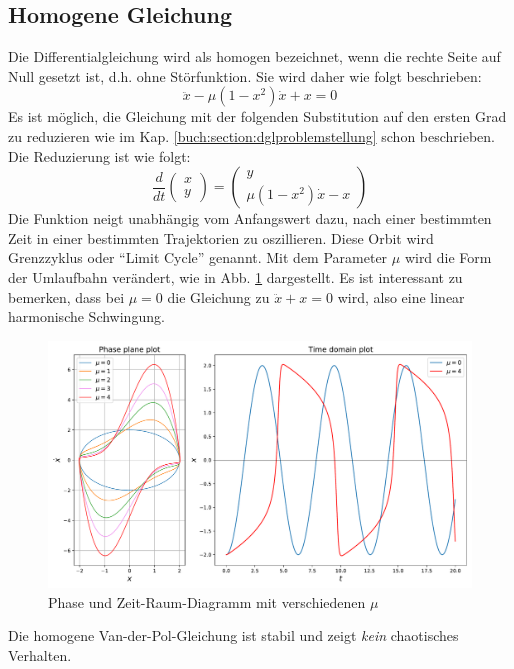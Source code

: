\subsection{Homogene Gleichung
\label{vanderpol:subsection:homogene}}
Die Differentialgleichung wird als homogen bezeichnet, wenn die rechte Seite auf Null gesetzt ist, d.h. ohne Störfunktion. Sie wird daher wie folgt beschrieben:
\begin{equation}
	\ddot{x} - \mu \left(1-x^{2}\right)\dot{x}+x = 0
\label{vanderpol:equations:homogene}
\end{equation}
Es ist möglich, die Gleichung mit der folgenden Substitution auf den ersten Grad zu reduzieren wie im Kap. \ref{buch:section:dglproblemstellung} schon beschrieben. Die Reduzierung ist wie folgt:
\begin{equation}
\frac{d}{dt}\begin{pmatrix}x \\ y\end{pmatrix} = \begin{pmatrix}y \\ \mu \left(1-x^{2}\right)\dot{x}-x\end{pmatrix}
\label{vanderpol:equations:homogene_1}
\end{equation}
Die Funktion neigt unabhängig vom Anfangswert dazu, nach einer bestimmten Zeit in einer bestimmten Trajektorien zu oszillieren. Diese Orbit wird Grenzzyklus oder ``Limit Cycle'' genannt. Mit dem Parameter $\mu$ wird die Form der Umlaufbahn verändert, wie in Abb. \ref{vanderpol:figures:homogene} dargestellt. Es ist interessant zu bemerken, dass bei $\mu = 0$ die Gleichung zu $\ddot{x} + x = 0$ wird, also eine linear harmonische Schwingung.
\begin{figure}
	\centering
	\includegraphics[width=\textwidth]{papers/vanderpol/figures/homogene_plot.pdf}
	\caption{Phase und Zeit-Raum-Diagramm mit verschiedenen $\mu$\label{vanderpol:figures:homogene}}
\end{figure}
Die homogene Van-der-Pol-Gleichung ist stabil und zeigt {\em kein} chaotisches Verhalten.
